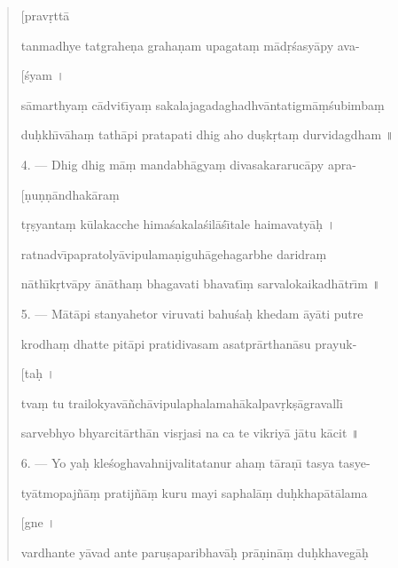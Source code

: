 \documentclass[a4paper, 11pt, oneside, french]{article}
\begin{document}
\begin{quotation}
\hspace*{25mm}[prav\d{r}tt\={a}

tanmadhye tatgrahe\d{n}a graha\d{n}am upagata\d{m} m\={a}d\d{r}\'{s}asy\={a}py ava-

\hspace*{25mm}[\'{s}yam \texthindi{।}

s\={a}marthya\d{m} c\={a}dvit\={\i}ya\d{m} sakalajagadaghadhv\={a}ntatigm\={a}\d{m}\'{s}ubimba\d{m}

du\d{h}kh\={\i}v\={a}ha\d{m} tath\={a}pi pratapati dhig aho du\d{s}k\d{r}ta\d{m} durvidagdham \texthindi{॥}

\bigskip

4. --- Dhig dhig m\={a}\d{m} mandabh\={a}gya\d{m} divasakararuc\={a}py apra-

\hspace*{25mm}[\d{n}u\d{n}\d{n}\={a}ndhak\={a}ra\d{m}

t\d{r}\d{s}yanta\d{m} k\={u}lakacche hima\'{s}akala\'{s}il\={a}\'{s}\={\i}tale haimavaty\={a}\d{h} \texthindi{।}

ratnadv\={\i}papratoly\={a}vipulama\d{n}iguh\={a}gehagarbhe daridra\d{m}

n\={a}th\={\i}k\d{r}tv\={a}py \={a}n\={a}tha\d{m} bhagavati bhavat\={\i}\d{m} sarvalokaikadh\={a}tr\={\i}m \texthindi{॥}

\bigskip

5. --- M\={a}t\={a}pi stanyahetor viruvati bahu\'{s}a\d{h} khedam \={a}y\={a}ti putre

krodha\d{m} dhatte pit\={a}pi pratidivasam asatpr\={a}rthan\={a}su prayuk-

\hspace*{25mm}[ta\d{h} \texthindi{।}

tva\d{m} tu trailokyav\={a}\~{n}ch\={a}vipulaphalamah\={a}kalpav\d{r}k\d{s}\={a}gravall\={\i}

sarvebhyo bhyarcit\={a}rth\={a}n vis\d{r}jasi na ca te vikriy\={a} j\={a}tu k\={a}cit \texthindi{॥}

\bigskip

6. --- Yo ya\d{h} kle\'{s}oghavahnijvalitatanur aha\d{m} t\={a}ra\d{n}\={\i} tasya tasye-

ty\={a}tmopaj\~{n}\={a}\d{m} pratij\~{n}\={a}\d{m} kuru mayi saphal\={a}\d{m} du\d{h}khap\={a}t\={a}lama

\hspace*{25mm}[gne \texthindi{।}

vardhante y\={a}vad ante paru\d{s}aparibhav\={a}\d{h} pr\={a}\d{n}in\={a}\d{m} du\d{h}khaveg\={a}\d{h}


\end{quotation}
\end{document}

